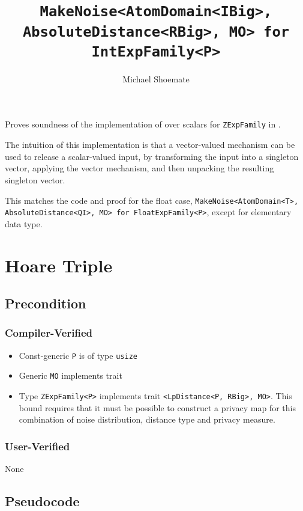 \documentclass{article}
\title{\texttt{MakeNoise<AtomDomain<IBig>, AbsoluteDistance<RBig>, MO> for IntExpFamily<P>}}
\author{Michael Shoemate}
\date{}
\begin{document}
\maketitle

\contrib
Proves soundness of the implementation of  over scalars
for \texttt{ZExpFamily} in .

The intuition of this implementation is that a vector-valued mechanism can be used to release a scalar-valued input,
by transforming the input into a singleton vector, 
applying the vector mechanism, and then unpacking the resulting singleton vector.

This matches the code and proof for the float case, \texttt{MakeNoise<AtomDomain<T>, AbsoluteDistance<QI>, MO> for FloatExpFamily<P>},
except for elementary data type.

\section{Hoare Triple}
\subsection*{Precondition}
\subsubsection*{Compiler-Verified}

\begin{itemize}
    \item Const-generic \texttt{P} is of type \texttt{usize}
    \item Generic \texttt{MO} implements trait 
    \item Type \texttt{ZExpFamily<P>} implements trait \texttt{<LpDistance<P, RBig>, MO>}.
        This bound requires that it must be possible to construct a privacy map for this combination of noise distribution, distance type and privacy measure.
\end{itemize}

\subsubsection*{User-Verified}
None

\subsection*{Pseudocode}

\end{document}
